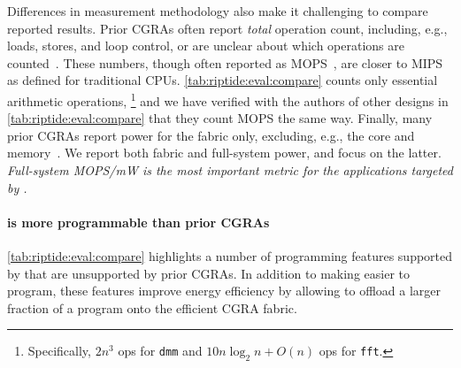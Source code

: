 Differences in measurement methodology also make it challenging to compare reported results.
% 
Prior CGRAs often report \emph{total} operation count, including, e.g., loads, stores, and loop control, or are unclear about which operations are counted~\cite{srp,ipa,cma}.
% 
These numbers, though often reported as MOPS~\cite{srp,ipa}, are closer to MIPS as defined for traditional CPUs.
% 
%
\autoref{tab:riptide:eval:compare} counts only essential arithmetic operations,%
\footnote{Specifically, $2n^3$ ops for {\tt dmm} and $10 n \log_2 n + O(n)$ ops for {\tt fft}.}
and we have verified with the authors
of other designs in \autoref{tab:riptide:eval:compare} that they count MOPS the same way.
%
Finally, many prior CGRAs report power for the fabric only,
excluding, e.g., the core and memory~\cite{revamp,cma,kim2009hierarchical}.
%
We report both fabric and full-system power, and focus on the latter.
%
\emph{Full-system MOPS/mW is the most important metric for
the applications targeted by \riptide.}


\paragraph{\riptide is more programmable than prior CGRAs}
%
\autoref{tab:riptide:eval:compare} highlights a number of programming
features supported by \riptide that are unsupported by prior CGRAs.
%
In addition to making \riptide easier to program,
these features improve energy efficiency by allowing \riptide to offload a larger fraction
of a program onto the efficient CGRA fabric.

